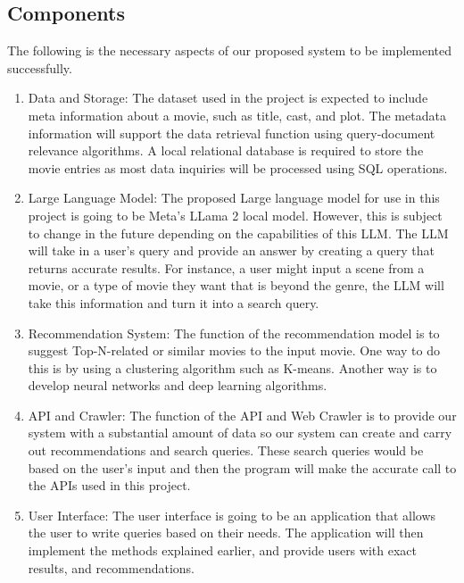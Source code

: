 \documentclass[journal]{IEEEtran}
\begin{document}
\subsection{Components}
The following is the necessary aspects of our proposed system to be implemented successfully.
\begin{enumerate}
    \item {Data and Storage}: The dataset used in the project is expected to include meta information about a movie, such as title, cast, and plot. The metadata information will support the data retrieval function using query-document relevance algorithms. A local relational database is required to store the movie entries as most data inquiries will be processed using SQL operations. 

    \item {Large Language Model}: The proposed Large language model for use in this project is going to be Meta’s LLama 2 local model. However, this is subject to change in the future depending on the capabilities of this LLM. The LLM will take in a user’s query and provide an answer by creating a query that returns accurate results. For instance, a user might input a scene from a movie, or a type of movie they want that is beyond the genre, the LLM will take this information and turn it into a search query.

    \item {Recommendation System}: The function of the recommendation model is to suggest Top-N-related or similar movies to the input movie. One way to do this is by using a clustering algorithm such as K-means. Another way is to develop neural networks and deep learning algorithms.

    \item {API and Crawler}: The function of the API and Web Crawler is to provide our system with a substantial amount of data so our system can create and carry out recommendations and search queries. These search queries would be based on the user’s input and then the program will make the accurate call to the APIs used in this project.

    \item {User Interface}: The user interface is going to be an application that allows the user to write queries based on their needs. The application will then implement the methods explained earlier, and provide users with exact results, and recommendations.
    

\end{enumerate}
\end{document}
